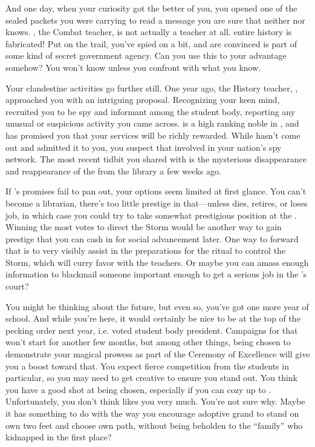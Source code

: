 \documentclass[char]{GL2020}
\begin{document}
And one day, when your curiosity got the better of you, you opened one of the sealed packets you were carrying to read a message you are sure that neither \cEthics{} nor \cChupSecond{} knows. \cInterpol{\full}, the Combat teacher, is not actually a teacher at all. \cInterpol{\Their} entire history is fabricated! Put on the trail, you've spied on \cInterpol{} a bit, and are convinced \cInterpol{} is part of some kind of secret government agency. Can you use this to your advantage somehow? You won't know unless you confront \cInterpol{\them} with what you know.

Your clandestine activities go further still. One year ago, the History teacher, \cHistory{\full}, approached you with an intriguing proposal. Recognizing your keen mind, \cHistory{\they} recruited you to be \cHistory{\their} spy and informant among the student body, reporting any unusual or suspicious activity you came across. \cHistory{} is a high ranking noble in \pFarm{}, and has promised you that your services will be richly rewarded. While \cHistory{\they} hasn't come out and admitted it to you, you suspect that \cHistory{\theyare} involved in your nation's spy network. The most recent tidbit you shared with \cHistory{\them} is the mysterious disappearance and reappearance of the \iScythe{} from the library a few weeks ago.

If \cHistory{}'s promises fail to pan out, your options seem limited at first glance. You can't become a librarian, there's too little prestige in that---unless \cLibrarian{} dies, retires, or loses \cLibrarian{\their} job, in which case you could try to take \cLibrarian{\their} somewhat prestigious position at the \pSc{}. Winning the most votes to direct the Storm would be another way to gain prestige that you can cash in for social advancement later. One way to forward that is to very visibly assist in the preparations for the ritual to control the Storm, which will curry favor with the teachers. Or maybe you can amass enough information to blackmail someone important enough to get a serious job in the \cQueen{\Majesty}'s court? 

You might be thinking about the future, but even so, you've got one more year of school. And while you're here, it would certainly be nice to be at the top of the pecking order next year, i.e. voted student body president. Campaigns for that won't start for another few months, but among other things, being chosen to demonstrate your magical prowess as part of the Ceremony of Excellence will give you a boost toward that. You expect fierce competition from the \pTech{} students in particular, so you may need to get creative to ensure you stand out. You think you have a good shot at being chosen, especially if you can cozy up to \cMusic{\full}. Unfortunately, you don't think \cMusic{} likes you very much. You're not sure why. Maybe it has something to do with the way you encourage \cMusic{\their} adoptive grand\cAdopted{\nibling} \cAdopted{} to stand on \cAdopted{\their} own two feet and choose \cAdopted{\their} own path, without being beholden to the ``family'' who kidnapped \cAdopted{\them} in the first place?
\end{document}
